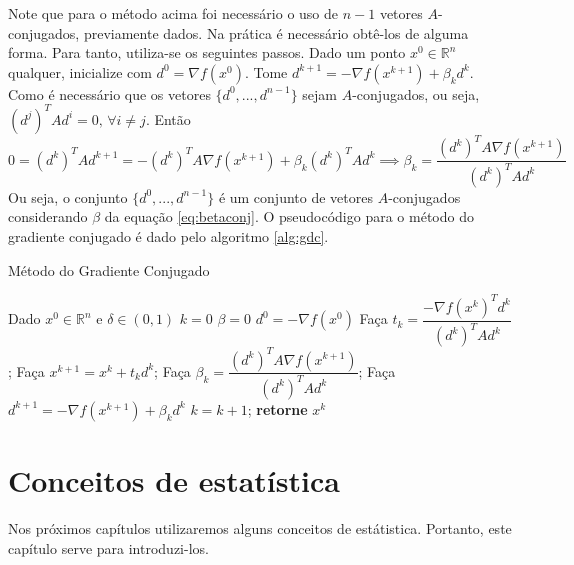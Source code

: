 \documentclass[
	12pt,				%
    oneside,			%
	a4paper,			%
	english,			%
	french,				%
	spanish,			%
	brazil,				%
	]{abntex2}
\newcommand{\norm}[1]{\left\lVert#1\right\rVert}
\begin{document}
        Note que para o método acima foi necessário o uso de $n-1$ vetores $A$-conjugados, previamente dados. Na prática é necessário obtê-los de alguma forma. Para tanto, utiliza-se os seguintes passos. Dado um ponto $x^0 \in \mathbb{R}^n$ qualquer, inicialize com $d^0 = \nabla f(x^0)$. Tome $d^{k+1} = - \nabla f(x^{k+1}) + \beta_k d^k$. Como é necessário que os vetores $\{d^0,...,d^{n-1}\}$ sejam $A$-conjugados, ou seja, $(d^j)^TAd^i = 0\mbox{, }\forall i \neq j$. Então
        \begin{equation}\label{eq:betaconj}
            0 = (d^k)^TAd^{k+1} = - (d^k)^TA\nabla f(x^{k+1}) + \beta_k (d^k)^TAd^k \implies \beta_k = \frac{(d^k)^TA\nabla f(x^{k+1})}{(d^k)^T A d^k}
        \end{equation}
        Ou seja, o conjunto $\{d^0,...,d^{n-1}\}$ é um conjunto de vetores $A$-conjugados considerando $\beta$ da equação \eqref{eq:betaconj}.
        O pseudocódigo para o método do gradiente conjugado é dado pelo algoritmo \ref{alg:gdc}.

        \begin{algorithm}[htb]
            \label{alg:gdc}
            \caption{Método do Gradiente Conjugado}
            \begin{algorithmic}[1]
                \State Dado $x^0 \in \mathbb{R}^n$ e $\delta \in (0,1)$
                \State $k = 0$
                \State $\beta = 0$
                \State $d^0 = -\nabla f(x^0)$
                \While{$\norm{\nabla f(x^k)} > \delta$}
                    \State Faça $t_k = \dfrac{-\nabla f(x^k)^Td^k}{(d^k)^TAd^k}$;
                    \State Faça $x^{k+1} = x^k + t_k d^k$;
                    \State Faça $\beta_k = \dfrac{(d^k)^TA\nabla f(x^{k+1})}{(d^k)^TAd^k}$;
                    \State Faça $d^{k+1} = -\nabla f(x^{k+1}) + \beta_k d^k$
                    \State $k = k+1$;
                \EndWhile
                \State \textbf{retorne} $x^k$
            \end{algorithmic}
        \end{algorithm}


\chapter{Conceitos de estatística}
    Nos próximos capítulos utilizaremos alguns conceitos de estátistica. Portanto, este capítulo serve para introduzi-los.
\end{document}
